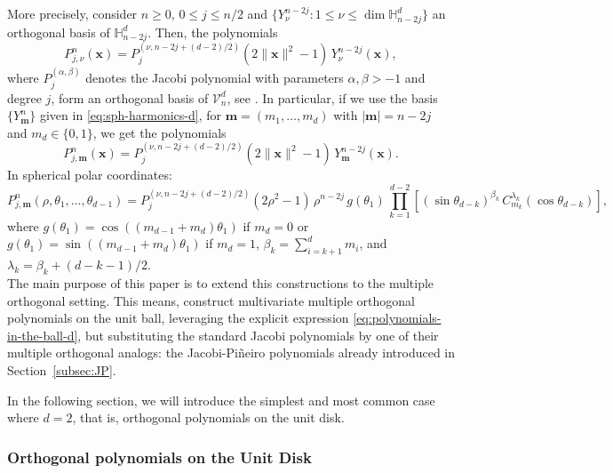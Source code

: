 \documentclass[a4paper]{article}
\theoremstyle{plain}
\theoremstyle{definition}
\begin{document}
    More precisely, consider $n\geq 0$, $0\leq j\leq n/2$ and $\{Y_\nu^{n-2j}:1\leq \nu\leq \dim \mathbb H_{n-2j}^d\}$ an orthogonal basis of $\mathbb H_{n-2j}^d$. Then, the polynomials
    \begin{equation}
        \label{eq:polynomials-in-the-ball-d}
        P_{j,\nu}^n (\mathbf x)=P_j^{(\nu,n-2j+(d-2)/2)}(2\|\mathbf x\|^2-1) \, Y_{\nu}^{n-2j}(\mathbf x),
    \end{equation}
    where $P^{(\alpha,\beta)}_j$ denotes the Jacobi polynomial with parameters $\alpha,\beta>-1$ and degree $j$, form an orthogonal basis of $\mathcal V_n^d$, see \cite[Proposition 5.2.1]{DX14}. In particular, if we use the basis $\{Y_{\mathbf m}^n\}$ given in \eqref{eq:sph-harmonics-d}, for $\mathbf m =(m_1,\dots,m_{d})$ with $|\mathbf m|=n-2j$ and $m_d\in\{0,1\}$, we get the polynomials
    \begin{equation}
        \label{eq:polynomials-in-the-ball-d-2}
        P_{j,\mathbf m}^n (\mathbf x)=P_j^{(\nu,n-2j+(d-2)/2)}(2\|\mathbf x\|^2-1) \, Y_{\mathbf m}^{n-2j}(\mathbf x).
    \end{equation}
    In spherical polar coordinates:
    \begin{equation}
        \label{eq:polynomials-in-the-ball-d-2-sph}
        P_{j,\mathbf m}^n (\rho,\theta_1,\dots,\theta_{d-1})=P_j^{(\nu,n-2j+(d-2)/2)}(2\rho^2-1) \,\rho^{n-2j}\, g(\theta_1)\, \prod_{k=1}^{d-2}\left[ (\sin\theta_{d-k})^{\beta_k}\, C_{m_k}^{\lambda_k}(\cos \theta_{d-k}) \right],
    \end{equation}
    where $g(\theta_1)=\cos((m_{d-1}+m_d)\theta_1)$ if $m_d=0$ or $g(\theta_1)=\sin((m_{d-1}+m_d)\theta_1)$ if $m_d=1$, $\beta_k=\sum_{i=k+1}^d m_i$, and $\lambda_k = \beta_k + (d-k-1)/2$. \\
    
    

    The main purpose of this paper is to extend this constructions to the multiple orthogonal setting. This means, construct multivariate multiple orthogonal polynomials on the unit ball, leveraging the explicit expression \eqref{eq:polynomials-in-the-ball-d}, but substituting the standard Jacobi polynomials by one of their multiple orthogonal analogs: the Jacobi-Pi\~neiro polynomials already introduced in Section~\ref{subsec:JP}. 

    In the following section, we will introduce the simplest and most common case where $d=2$, that is, orthogonal polynomials on the unit disk. 

    
    \subsubsection{Orthogonal polynomials on the Unit Disk}
    \label{sec:OP-disk}
\end{document}
